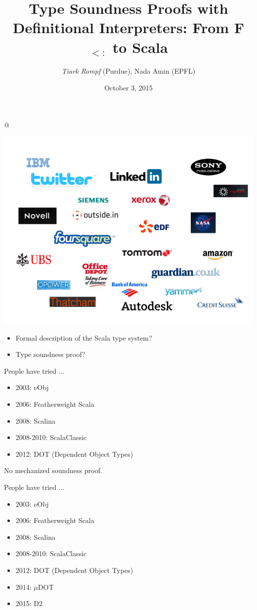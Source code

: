 \documentclass{beamer}
\title{Type Soundness Proofs with Definitional Interpreters: From F$_{<:}$ to Scala}
\author{{\it Tiark Rompf} (Purdue), Nada Amin (EPFL)}
\institute{}
\date{October 3, 2015}
\begin{document}
\lstMakeShortInline[%
              flexiblecolumns=false,%
              mathescape=false,%
              basicstyle=\tt]@



\frame{\titlepage}

\begin{frame}[fragile]
\includegraphics[width=\textwidth]{industry.png}
\end{frame}

\begin{frame}[fragile]
\begin{itemize}
\item Formal description of the Scala type system?
\item Type soundness proof?
\end{itemize}
\end{frame}


\begin{frame}[fragile]{People have tried ...}
\begin{itemize}
\item 2003: $\nu$Obj
\item 2006: Featherweight Scala
\item 2008: Scalina
\item 2008-2010: ScalaClassic
\item 2012: DOT (Dependent Object Types)
\end{itemize}
No mechanized soundness proof.
\end{frame}

\begin{frame}[fragile]{People have tried ...}
\begin{itemize}
\item 2003: $\nu$Obj
\item 2006: Featherweight Scala
\item 2008: Scalina
\item 2008-2010: ScalaClassic
\item 2012: DOT (Dependent Object Types)
\vspace{1cm}
\item 2014: $\mu$DOT
\item 2015: D2
\end{itemize}
\end{frame}
\end{document}
